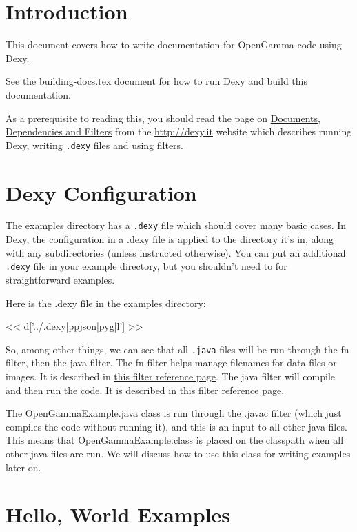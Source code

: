 \section{Introduction}

This document covers how to write documentation for OpenGamma code using Dexy.

See the building-docs.tex document for how to run Dexy and build this
documentation.

As a prerequisite to reading this, you should read the page on
\href{http://www.dexy.it/docs/guide/documents-dependencies-and-filters/}{Documents, Dependencies and Filters}
from the \url{http://dexy.it} website which describes running Dexy, writing
\verb|.dexy| files and using filters.

\section{Dexy Configuration}

The examples directory has a \verb|.dexy| file which should cover many basic
cases. In Dexy, the configuration in a .dexy file is applied to the directory
it's in, along with any subdirectories (unless instructed otherwise). You can
put an additional \verb|.dexy| file in your example directory, but you
shouldn't need to for straightforward examples.

Here is the .dexy file in the examples directory:

<< d['../.dexy|ppjson|pyg|l'] >>

So, among other things, we can see that all \verb|.java| files will be run
through the fn filter, then the java filter. The fn filter helps manage
filenames for data files or images. It is described in
\href{http://www.dexy.it/docs/filters/FilenameFilter-(fn).html}{this filter reference page}.
The java filter will compile and then run the code. It is described in
\href{http://www.dexy.it/docs/filters/JavaFilter-(java).html}{this filter reference page}.

The OpenGammaExample.java class is run through the .javac filter (which just
compiles the code without running it), and this is an input to all other java
files. This means that OpenGammaExample.class is placed on the classpath when
all other java files are run. We will discuss how to use this class for writing
examples later on.

\section{Hello, World Examples}

